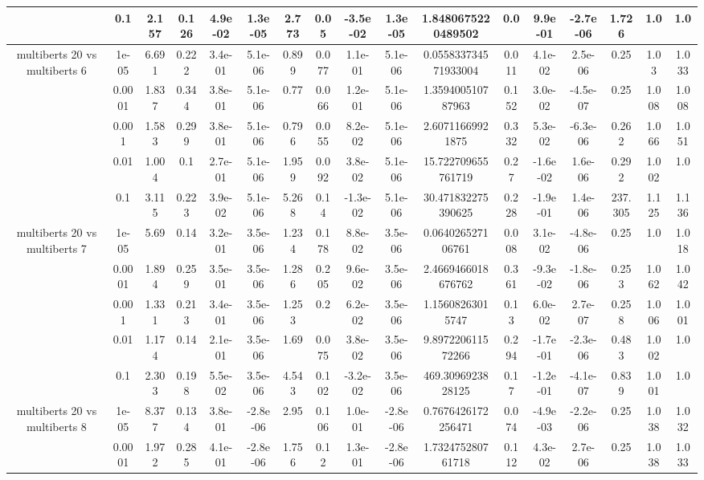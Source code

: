 \begin{tabular}{|c|c|c|c|c|c|c|c|c|c|c|c|c|c|c|c|c|}
 & 0.1 & 2.157 & 0.126 & 4.9e-02 & 1.3e-05 & 2.773 & 0.05 & -3.5e-02 & 1.3e-05 & 1.8480675220489502 & 0.0 & 9.9e-01 & -2.7e-06 & 1.726 & 1.0 & 1.0 \\
\hline
\multirow{5}{*}{multiberts 20 vs multiberts 6} & 1e-05 & 6.691 & 0.222 & 3.4e-01 & 5.1e-06 & 0.899 & 0.077 & 1.1e-01 & 5.1e-06 & 0.055833734571933004 & 0.011 & 4.1e-02 & 2.5e-06 & 0.25 & 1.03 & 1.033 \\
 & 0.0001 & 1.837 & 0.344 & 3.8e-01 & 5.1e-06 & 0.77 & 0.066 & 1.2e-01 & 5.1e-06 & 1.359400510787963 & 0.152 & 3.0e-02 & -4.5e-07 & 0.25 & 1.008 & 1.008 \\
 & 0.001 & 1.583 & 0.299 & 3.8e-01 & 5.1e-06 & 0.796 & 0.055 & 8.2e-02 & 5.1e-06 & 2.60711669921875 & 0.332 & 5.3e-02 & -6.3e-06 & 0.262 & 1.066 & 1.051 \\
 & 0.01 & 1.004 & 0.1 & 2.7e-01 & 5.1e-06 & 1.959 & 0.092 & 3.8e-02 & 5.1e-06 & 15.722709655761719 & 0.27 & -1.6e-02 & 1.6e-06 & 0.292 & 1.002 & 1.0 \\
 & 0.1 & 3.115 & 0.223 & 3.9e-02 & 5.1e-06 & 5.268 & 0.14 & -1.3e-02 & 5.1e-06 & 30.471832275390625 & 0.228 & -1.9e-01 & 1.4e-06 & 237.305 & 1.125 & 1.136 \\
\hline
\multirow{5}{*}{multiberts 20 vs multiberts 7} & 1e-05 & 5.69 & 0.14 & 3.2e-01 & 3.5e-06 & 1.234 & 0.178 & 8.8e-02 & 3.5e-06 & 0.064026527106761 & 0.008 & 3.1e-02 & -4.8e-06 & 0.25 & 1.0 & 1.018 \\
 & 0.0001 & 1.894 & 0.259 & 3.5e-01 & 3.5e-06 & 1.286 & 0.205 & 9.6e-02 & 3.5e-06 & 2.4669466018676762 & 0.361 & -9.3e-02 & -1.8e-06 & 0.253 & 1.062 & 1.042 \\
 & 0.001 & 1.331 & 0.213 & 3.4e-01 & 3.5e-06 & 1.253 & 0.2 & 6.2e-02 & 3.5e-06 & 1.15608263015747 & 0.13 & 6.0e-02 & 2.7e-07 & 0.258 & 1.006 & 1.001 \\
 & 0.01 & 1.174 & 0.14 & 2.1e-01 & 3.5e-06 & 1.69 & 0.075 & 3.8e-02 & 3.5e-06 & 9.897220611572266 & 0.294 & -1.7e-01 & -2.3e-06 & 0.483 & 1.002 & 1.0 \\
 & 0.1 & 2.303 & 0.198 & 5.5e-02 & 3.5e-06 & 4.543 & 0.102 & -3.2e-02 & 3.5e-06 & 469.3096923828125 & 0.17 & -1.2e-01 & -4.1e-07 & 0.839 & 1.001 & 1.0 \\
\hline
\multirow{5}{*}{multiberts 20 vs multiberts 8} & 1e-05 & 8.377 & 0.134 & 3.8e-01 & -2.8e-06 & 2.95 & 0.106 & 1.0e-01 & -2.8e-06 & 0.7676426172256471 & 0.074 & -4.9e-03 & -2.2e-06 & 0.25 & 1.038 & 1.032 \\
 & 0.0001 & 1.972 & 0.285 & 4.1e-01 & -2.8e-06 & 1.756 & 0.12 & 1.3e-01 & -2.8e-06 & 1.732475280761718 & 0.112 & 4.3e-02 & 2.7e-06 & 0.25 & 1.038 & 1.033 \\

\end{tabular}
